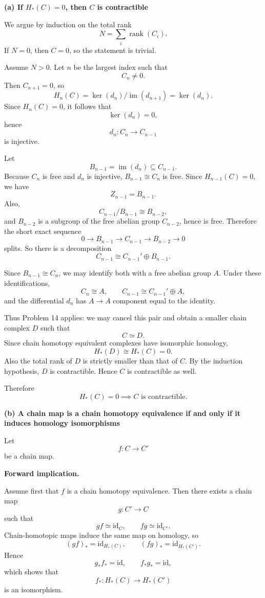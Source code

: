 \begin{solution}

\medskip
\noindent\textbf{(a) If \(H_*(C)=0\), then \(C\) is contractible}\par
\smallskip


We argue by induction on the total rank
\[
N=\sum_i \operatorname{rank}(C_i).
\]
If \(N=0\), then \(C=0\), so the statement is trivial.

Assume \(N>0\). Let \(n\) be the largest index such that
\[
C_n\neq 0.
\]
Then \(C_{n+1}=0\), so
\[
H_n(C)=\ker(d_n)/\operatorname{im}(d_{n+1})=\ker(d_n).
\]
Since \(H_n(C)=0\), it follows that
\[
\ker(d_n)=0,
\]
hence
\[
d_n:C_n\to C_{n-1}
\]
is injective.

Let
\[
B_{n-1}=\operatorname{im}(d_n)\subseteq C_{n-1}.
\]
Because \(C_n\) is free and \(d_n\) is injective, \(B_{n-1}\cong C_n\) is free. Since \(H_{n-1}(C)=0\), we have
\[
Z_{n-1}=B_{n-1}.
\]
Also,
\[
C_{n-1}/B_{n-1}\cong B_{n-2},
\]
and \(B_{n-2}\) is a subgroup of the free abelian group \(C_{n-2}\), hence is free. Therefore the short exact sequence
\[
0\to B_{n-1}\to C_{n-1}\to B_{n-2}\to 0
\]
splits. So there is a decomposition
\[
C_{n-1}\cong C_{n-1}'\oplus B_{n-1}.
\]

Since \(B_{n-1}\cong C_n\), we may identify both with a free abelian group \(A\). Under these identifications,
\[
C_n\cong A,\qquad C_{n-1}\cong C_{n-1}'\oplus A,
\]
and the differential \(d_n\) has \(A\to A\) component equal to the identity.

Thus Problem 14 applies: we may cancel this pair and obtain a smaller chain complex \(D\) such that
\[
C\simeq D.
\]
Since chain homotopy equivalent complexes have isomorphic homology,
\[
H_*(D)\cong H_*(C)=0.
\]
Also the total rank of \(D\) is strictly smaller than that of \(C\). By the induction hypothesis, \(D\) is contractible. Hence \(C\) is contractible as well.

Therefore
\[
\boxed{H_*(C)=0 \implies C \text{ is contractible}.}
\]


\medskip
\noindent\textbf{(b) A chain map is a chain homotopy equivalence if and only if it induces homology isomorphisms}\par
\smallskip


Let
\[
f:C\to C'
\]
be a chain map.


\medskip
\noindent\textbf{Forward implication.}\par
\smallskip

Assume first that \(f\) is a chain homotopy equivalence. Then there exists a chain map
\[
g:C'\to C
\]
such that
\[
gf\simeq \mathrm{id}_C,\qquad fg\simeq \mathrm{id}_{C'}.
\]
Chain-homotopic maps induce the same map on homology, so
\[
(gf)_*=\mathrm{id}_{H_*(C)},\qquad (fg)_*=\mathrm{id}_{H_*(C')}.
\]
Hence
\[
g_*f_*=\mathrm{id},\qquad f_*g_*=\mathrm{id},
\]
which shows that
\[
f_*:H_*(C)\to H_*(C')
\]
is an isomorphism.



\end{solution}
